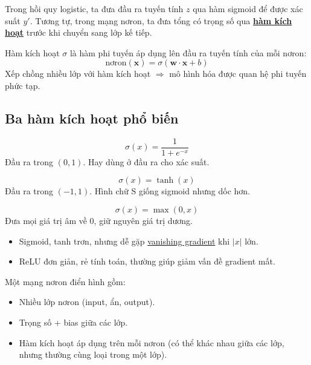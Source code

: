 \documentclass[12pt,a4paper]{article}
\begin{document}
\begin{vidu}[title={So sánh với logistic regression}]
Trong hồi quy logistic, ta đưa đầu ra tuyến tính $z$ qua hàm sigmoid để được xác suất $y'$. Tương tự, trong mạng nơron, ta đưa tổng có trọng số qua \href{https://developers.google.com/machine-learning/glossary\#activation_function}{\textbf{hàm kích hoạt}} trước khi chuyển sang lớp kế tiếp.
\end{vidu}

\begin{dinhnghia}[title={Hàm kích hoạt}]
Hàm kích hoạt $\sigma$ là hàm phi tuyến áp dụng lên đầu ra tuyến tính của mỗi nơron:
\[
  \text{nơron}(\boldsymbol x) = \sigma(\boldsymbol w \cdot \boldsymbol x + b)
\]
Xếp chồng nhiều lớp với hàm kích hoạt $\Rightarrow$ mô hình hóa được quan hệ phi tuyến phức tạp.
\end{dinhnghia}

\subsection{Ba hàm kích hoạt phổ biến}

\begin{congthuc}[title={Sigmoid}]
\[
  \sigma(x) = \frac{1}{1 + e^{-x}}
\]
Đầu ra trong $(0,1)$. Hay dùng ở đầu ra cho xác suất.
\end{congthuc}

\begin{congthuc}[title={tanh}]
\[
  \sigma(x) = \tanh(x)
\]
Đầu ra trong $(-1,1)$. Hình chữ S giống sigmoid nhưng dốc hơn.
\end{congthuc}

\begin{congthuc}[title={ReLU}]
\[
  \sigma(x) = \max(0,x)
\]
Đưa mọi giá trị âm về 0, giữ nguyên giá trị dương.
\end{congthuc}

\begin{tinhchat}[title={So sánh sigmoid, tanh, ReLU}]
\begin{itemize}
  \item Sigmoid, tanh trơn, nhưng dễ gặp \href{https://developers.google.com/machine-learning/glossary\#vanishing-gradient-problem}{vanishing gradient} khi $|x|$ lớn.
  \item ReLU đơn giản, rẻ tính toán, thường giúp giảm vấn đề gradient mất.
\end{itemize}
\end{tinhchat}

\begin{luuy}[title={Tóm tắt kiến trúc mạng nơron}]
Một mạng nơron điển hình gồm:
\begin{itemize}
  \item Nhiều lớp nơron (input, ẩn, output).
  \item Trọng số + bias giữa các lớp.
  \item Hàm kích hoạt áp dụng trên mỗi nơron (có thể khác nhau giữa các lớp, nhưng thường cùng loại trong một lớp).
\end{itemize}
\end{luuy}
\end{document}
